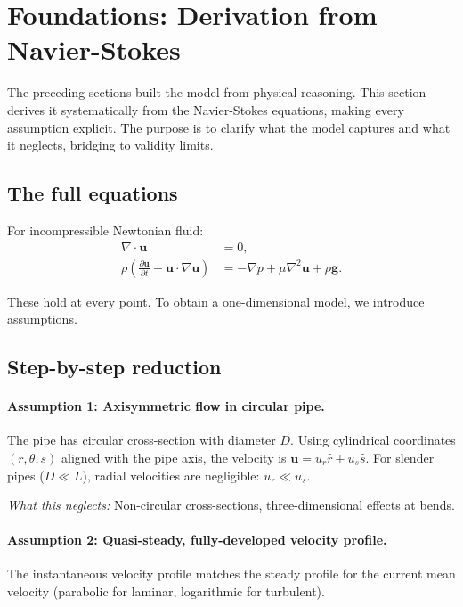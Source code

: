 \documentclass[11pt]{article}
\begin{document}
\section{Foundations: Derivation from Navier-Stokes}
\label{sec:navier-stokes}

The preceding sections built the model from physical reasoning. This section derives it systematically from the Navier-Stokes equations, making every assumption explicit. The purpose is to clarify what the model captures and what it neglects, bridging to validity limits.

\subsection{The full equations}

For incompressible Newtonian fluid:
\begin{align}
  \nabla \cdot \mathbf{u} &= 0, \label{eq:NS-cont} \\
  \rho\left(\frac{\partial \mathbf{u}}{\partial t} + \mathbf{u} \cdot \nabla\mathbf{u}\right) &= -\nabla p + \mu\nabla^2\mathbf{u} + \rho\mathbf{g}. \label{eq:NS-mom}
\end{align}

These hold at every point. To obtain a one-dimensional model, we introduce assumptions.

\subsection{Step-by-step reduction}

\paragraph{Assumption 1: Axisymmetric flow in circular pipe.}
The pipe has circular cross-section with diameter $D$. Using cylindrical coordinates $(r, \theta, s)$ aligned with the pipe axis, the velocity is $\mathbf{u} = u_r\hat{r} + u_s\hat{s}$. For slender pipes ($D \ll L$), radial velocities are negligible: $u_r \ll u_s$.

\emph{What this neglects:} Non-circular cross-sections, three-dimensional effects at bends.

\paragraph{Assumption 2: Quasi-steady, fully-developed velocity profile.}
The instantaneous velocity profile matches the steady profile for the current mean velocity (parabolic for laminar, logarithmic for turbulent).
\end{document}
